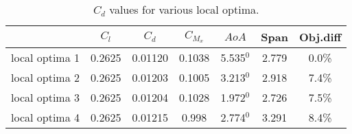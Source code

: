 \begin{table}[!htbp]
    \centering
    \begin{tabular}{|c|c|c|c|c|c|c|}\hline
          & $C_l$ & $C_d$ & $C_{M_x}$ & $AoA$ & Span & Obj.diff \\\hline
        local optima 1 & 0.2625 & 0.01120   & 0.1038 & 5.535$^0$ & 2.779 & 0.0\%\\
        local optima 2 & 0.2625 & 0.01203   & 0.1005 & 3.213$^0$ & 2.918 & 7.4\%\\
        local optima 3 & 0.2625 & 0.01204   & 0.1028 & 1.972$^0$ & 2.726 & 7.5\%\\
        local optima 4 & 0.2625 & 0.01215   & 0.998  & 2.774$^0$ & 3.291 & 8.4\%\\ \hline
    \end{tabular}
    \caption{$C_d$ values for various local optima.}
    \label{optimal shape}
\end{table}